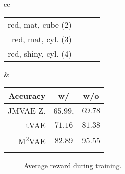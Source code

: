 \begin{confidential}
\begin{table}
\begin{tabular}{cc}
\begin{tabular}{r c c c}
		red, mat, cube   (2) &            & \checkmark & \\
		red, mat, cyl.   (3) & \checkmark & \checkmark & \checkmark\\
		red, shiny, cyl. (4) &            &            & \checkmark
	\end{tabular}
	&
	\begin{tabular}{r c c}
		\textbf{Accuracy} & w/ & w/o \\
		\hline			
		JMVAE-Z.  & $65.99$,  & $69.78$ \\
		tVAE      & $71.16$   & $81.38$ \\
		M\textsuperscript{2}VAE     & $\mathbf{82.89}$   & $\mathbf{95.55}$ \\
		          &           & 
	\end{tabular}
    \end{tabular}
	\label{tab:class}
\end{table}
%
%
%
%
%
\begin{figure}[ht]
	\caption{Average reward during training.}
	\label{fig:reward}
\end{figure}
%
\end{confidential}